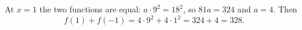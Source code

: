At $x=1$ the two functions are equal: $a\cdot9^2=18^2$, so $81a=324$ and $a=4$. Then
\[f(1)+f(-1)=4\cdot9^2+4\cdot1^2=324+4=\boxed{328}.\]
